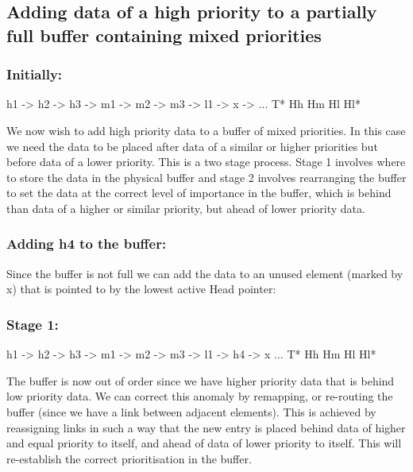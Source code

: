 \subsection*{Adding data of a high priority to a partially full buffer containing mixed priorities}

\subsubsection*{Initially\+:}


\begin{DoxyCode}
h1  ->  h2  ->  h3  -> m1  ->  m2  ->  m3  ->  l1  ->  x  ->  ...
T*
                Hh                     Hm      Hl      Hl*
\end{DoxyCode}


We now wish to add high priority data to a buffer of mixed priorities. In this case we need the data to be placed after data of a similar or higher priorities but before data of a lower priority. This is a two stage process. Stage 1 involves where to store the data in the physical buffer and stage 2 involves rearranging the buffer to set the data at the correct level of importance in the buffer, which is behind than data of a higher or similar priority, but ahead of lower priority data.

\subsubsection*{Adding h4 to the buffer\+:}

Since the buffer is not full we can add the data to an unused element (marked by x) that is pointed to by the lowest active Head pointer\+:

\subsubsection*{Stage 1\+:}


\begin{DoxyCode}
h1  ->  h2  ->  h3  -> m1  ->  m2  ->  m3  ->  l1  ->  h4  ->  x  ...
T*
                Hh                     Hm      Hl      Hl*
\end{DoxyCode}


The buffer is now out of order since we have higher priority data that is behind low priority data. We can correct this anomaly by remapping, or re-\/routing the buffer (since we have a link between adjacent elements). This is achieved by reassigning links in such a way that the new entry is placed behind data of higher and equal priority to itself, and ahead of data of lower priority to itself. This will re-\/establish the correct prioritisation in the buffer.


